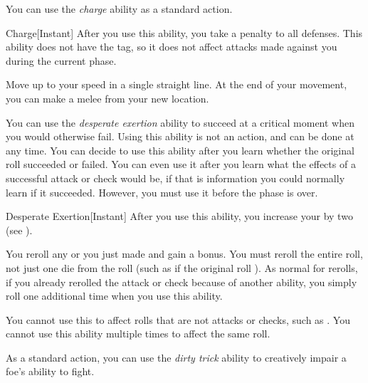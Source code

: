         \label{Charge} You can use the \textit{charge} ability as a standard action.

        \begin{instantability}{Charge}[Instant]
            \rankline
            After you use this ability, you  take a  penalty to all defenses.
            This ability does not have the  tag, so it does not affect attacks made against you during the current phase.

            Move up to your speed in a single straight line.
            At the end of your movement, you can make a melee  from your new location.
        \end{instantability}

        \label{Desperate Exertion} You can use the \textit{desperate exertion} ability to succeed at a critical moment when you would otherwise fail.
        Using this ability is not an action, and can be done at any time.
        You can decide to use this ability after you learn whether the original roll succeeded or failed.
        You can even use it after you learn what the effects of a successful attack or check would be, if that is information you could normally learn if it succeeded.
        However, you must use it before the phase is over.

        \begin{instantability}{Desperate Exertion}[Instant]
            \rankline
            After you use this ability, you increase your  by two (see ).

            You reroll any  or  you just made and gain a  bonus.
            You must reroll the entire roll, not just one die from the roll (such as if the original roll ).
            As normal for rerolls, if you already rerolled the attack or check because of another ability, you simply roll one additional time when you use this ability.

            You cannot use this to affect rolls that are not attacks or checks, such as .
            You cannot use this ability multiple times to affect the same roll.
        \end{instantability}

        \label{Dirty Trick} As a standard action, you can use the \textit{dirty trick} ability to creatively impair a foe's ability to fight.

